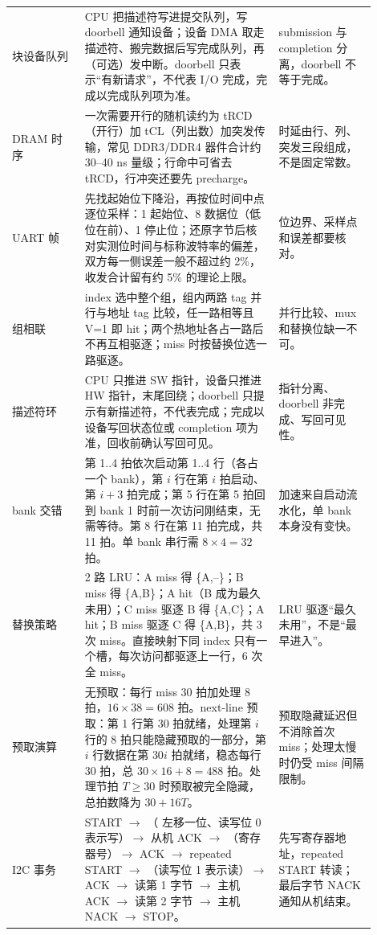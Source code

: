 \begin{longtable}{L{0.18\linewidth}L{0.48\linewidth}L{0.24\linewidth}}
块设备队列 & CPU 把描述符写进提交队列，写 doorbell 通知设备；设备 DMA 取走描述符、搬完数据后写完成队列，再（可选）发中断。doorbell 只表示“有新请求”，不代表 I/O 完成，完成以完成队列项为准。 & submission 与 completion 分离，doorbell 不等于完成。 \\
DRAM 时序 & 一次需要开行的随机读约为 tRCD（开行）加 tCL（列出数）加突发传输，常见 DDR3/DDR4 器件合计约 30--40 ns 量级；行命中可省去 tRCD，行冲突还要先 precharge。 & 时延由行、列、突发三段组成，不是固定常数。 \\
UART 帧 & 先找起始位下降沿，再按位时间中点逐位采样：1 起始位、8 数据位（低位在前）、1 停止位；还原字节后核对实测位时间与标称波特率的偏差，双方每一侧误差一般不超过约 2\%，收发合计留有约 5\% 的理论上限。 & 位边界、采样点和误差都要核对。 \\
组相联 & index 选中整个组，组内两路 tag 并行与地址 tag 比较，任一路相等且 V=1 即 hit；两个热地址各占一路后不再互相驱逐；miss 时按替换位选一路驱逐。 & 并行比较、mux 和替换位缺一不可。 \\
描述符环 & CPU 只推进 SW 指针，设备只推进 HW 指针，末尾回绕；doorbell 只提示有新描述符，不代表完成；完成以设备写回状态位或 completion 项为准，回收前确认写回可见。 & 指针分离、doorbell 非完成、写回可见性。 \\
bank 交错 & 第 1..4 拍依次启动第 1..4 行（各占一个 bank），第 $i$ 行在第 $i$ 拍启动、第 $i+3$ 拍完成；第 5 行在第 5 拍回到 bank 1 时前一次访问刚结束，无需等待。第 8 行在第 11 拍完成，共 11 拍。单 bank 串行需 $8\times4=32$ 拍。 & 加速来自启动流水化，单 bank 本身没有变快。 \\
替换策略 & 2 路 LRU：A miss 得 \{A,--\}；B miss 得 \{A,B\}；A hit（B 成为最久未用）；C miss 驱逐 B 得 \{A,C\}；A hit；B miss 驱逐 C 得 \{A,B\}，共 3 次 miss。直接映射下同 index 只有一个槽，每次访问都驱逐上一行，6 次全 miss。 & LRU 驱逐“最久未用”，不是“最早进入”。 \\
预取演算 & 无预取：每行 miss 30 拍加处理 8 拍，$16\times38=608$ 拍。next-line 预取：第 1 行第 30 拍就绪，处理第 $i$ 行的 8 拍只能隐藏预取的一部分，第 $i$ 行数据在第 $30i$ 拍就绪，稳态每行 30 拍，总 $30\times16+8=488$ 拍。处理节拍 $T\geq30$ 时预取被完全隐藏，总拍数降为 $30+16T$。 & 预取隐藏延迟但不消除首次 miss；处理太慢时仍受 miss 间隔限制。 \\
I2C 事务 & START $\rightarrow$ （ 左移一位、读写位 0 表示写）$\rightarrow$ 从机 ACK $\rightarrow$ （寄存器号）$\rightarrow$ ACK $\rightarrow$ repeated START $\rightarrow$ （读写位 1 表示读）$\rightarrow$ ACK $\rightarrow$ 读第 1 字节 $\rightarrow$ 主机 ACK $\rightarrow$ 读第 2 字节 $\rightarrow$ 主机 NACK $\rightarrow$ STOP。 & 先写寄存器地址，repeated START 转读；最后字节 NACK 通知从机结束。 \\

\end{longtable}
